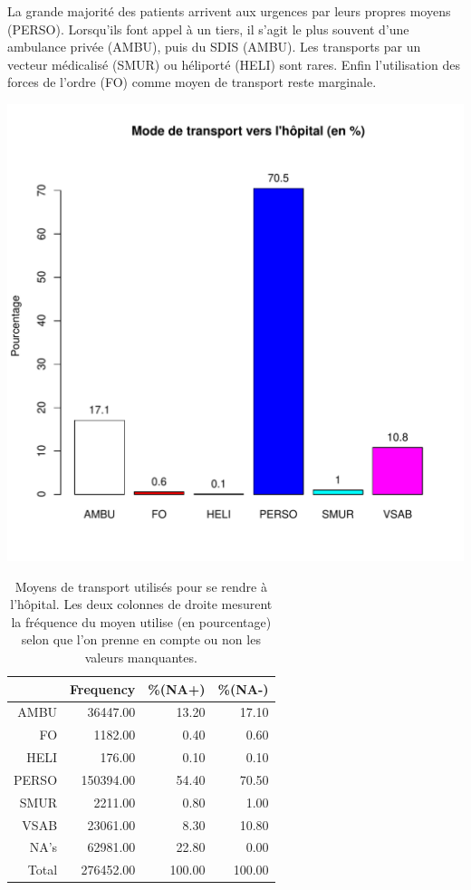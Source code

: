 \documentclass[12pt,english,french,twoside]{report}\usepackage[]{graphicx}\usepackage[]{color}
\makeatletter
\def\maxwidth{ %
  \ifdim\Gin@nat@width>\linewidth
    \linewidth
  \else
    \Gin@nat@width
  \fi
}
\makeatother
\begin{document}
La grande majorité des patients arrivent aux urgences par leurs propres moyens (PERSO). Lorsqu'ils font appel à un tiers, il s'agit le plus souvent d'une ambulance privée (AMBU), puis du SDIS (AMBU). Les transports par un vecteur médicalisé (SMUR) ou héliporté (HELI) sont rares. Enfin l'utilisation des forces de l'ordre (FO) comme moyen de transport reste marginale.


\includegraphics[width=\maxwidth]{figure/transport} 
\begin{table}[ht]
\centering
\begin{tabular}{rrrr}
  \hline
 & Frequency &   \%(NA+) &   \%(NA-) \\ 
  \hline
AMBU & 36447.00 & 13.20 & 17.10 \\ 
  FO & 1182.00 & 0.40 & 0.60 \\ 
  HELI & 176.00 & 0.10 & 0.10 \\ 
  PERSO & 150394.00 & 54.40 & 70.50 \\ 
  SMUR & 2211.00 & 0.80 & 1.00 \\ 
  VSAB & 23061.00 & 8.30 & 10.80 \\ 
  NA's & 62981.00 & 22.80 & 0.00 \\ 
    Total & 276452.00 & 100.00 & 100.00 \\ 
   \hline
\end{tabular}
\caption[Moyens de transport]{Moyens de transport utilisés pour se rendre à l'hôpital. Les deux colonnes de droite mesurent la fréquence du moyen utilise (en pourcentage) selon que l'on prenne en compte ou non les valeurs manquantes. } 
\label{transport}
\end{table}
\end{document}
